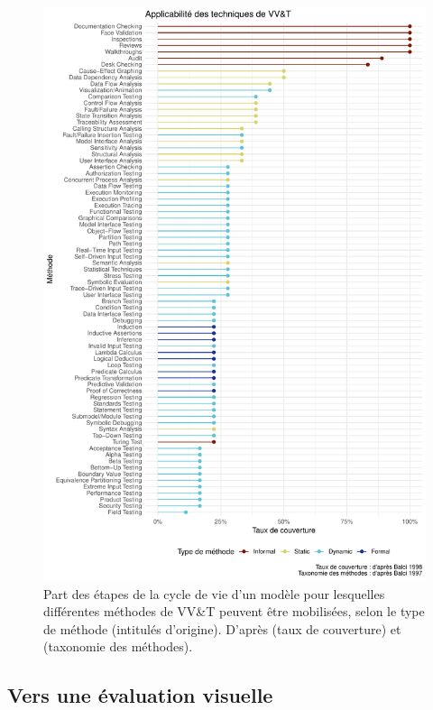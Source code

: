 \begin{figure}[H]
	\includegraphics[width=\linewidth]{img/VVetT_Balci.pdf}
	\caption{Part des étapes de la cycle de vie d'un modèle pour lesquelles différentes méthodes de \og VV\&T\fg{} peuvent être mobilisées, selon le type de méthode (intitulés d'origine).
	D'après \cite[Table 3, pp. 45-47]{balci1998verification} (taux de couverture) et \cite[Figure 2, p. 139]{balci_verification_1997} (taxonomie des méthodes).}
	\label{fig:taxonomy_balci}
\end{figure}


\subsection{Vers une évaluation visuelle}

